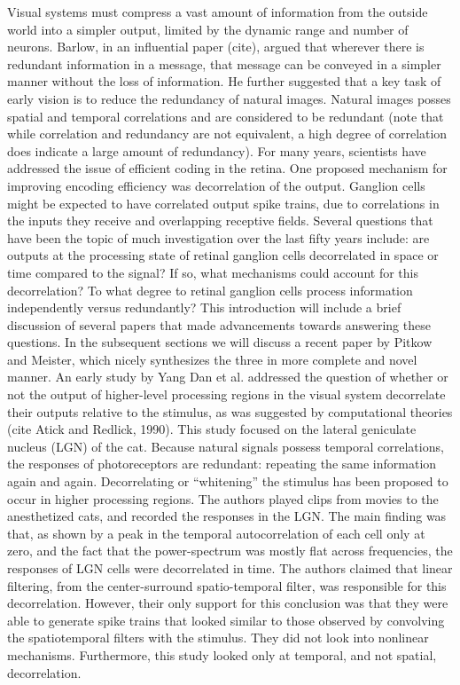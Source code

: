 \documentclass[12pt]{article}
\begin{document}
Visual systems must compress a vast amount of information from the outside world into a simpler output, limited by the dynamic range and number of neurons. Barlow, in an influential paper (cite), argued that wherever there is redundant information in a message, that message can be conveyed in a simpler manner without the loss of information. He further suggested that a key task of early vision is to reduce the redundancy of natural images. Natural images posses spatial and temporal correlations and are considered to be redundant (note that while correlation and redundancy are not equivalent, a high degree of correlation does indicate a large amount of redundancy). For many years, scientists have addressed the issue of efficient coding in the retina. One proposed mechanism for improving encoding efficiency was decorrelation of the output. Ganglion cells might be expected to have correlated output spike trains, due to correlations in the inputs they receive and overlapping receptive fields. Several questions that have been the topic of much investigation over the last fifty years include: are outputs at the processing state of retinal ganglion cells decorrelated in space or time compared to the signal? If so, what mechanisms could account for this decorrelation? To what degree to retinal ganglion cells process information independently versus redundantly? This introduction will include a brief discussion of several papers that made advancements towards answering these questions. In the subsequent sections we will discuss a recent paper by Pitkow and Meister, which nicely synthesizes the three in more complete and novel manner.
An early study by Yang Dan et al. addressed the question of whether or not the output of higher-level processing regions in the visual system decorrelate their outputs relative to the stimulus, as was suggested by computational theories (cite Atick and Redlick, 1990). This study focused on the lateral geniculate nucleus (LGN) of the cat. Because natural signals possess temporal correlations, the responses of photoreceptors are redundant: repeating the same information again and again. Decorrelating or “whitening” the stimulus has been proposed to occur in higher processing regions. The authors played clips from movies to the anesthetized cats, and recorded the responses in the LGN. The main finding was that, as shown by a peak in the temporal autocorrelation of each cell only at zero, and the fact that the power-spectrum was mostly flat across frequencies, the responses of LGN cells were decorrelated in time. The authors claimed that linear filtering, from the center-surround spatio-temporal filter, was responsible for this decorrelation. However, their only support for this conclusion was that they were able to generate spike trains that looked similar to those observed by convolving the spatiotemporal filters with the stimulus. They did not look into nonlinear mechanisms. Furthermore, this study looked only at temporal, and not spatial, decorrelation.
\end{document}
